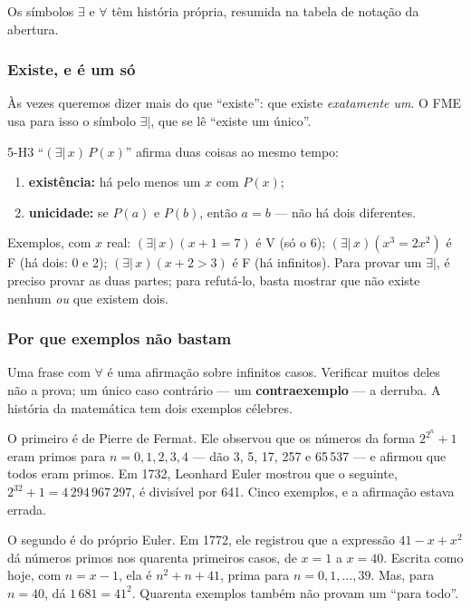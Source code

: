 Os símbolos $\exists$ e $\forall$ têm história própria, resumida na tabela de notação da abertura.

\subsubsection{Existe, e é um só}
Às vezes queremos dizer mais do que \enquote{existe}: que existe \emph{exatamente um}. O FME usa para isso o símbolo $\exists|$, que se lê \enquote{existe um único}.

\begin{construcao}{5-H3}
\enquote{$(\exists|\,x)\,P(x)$} afirma duas coisas ao mesmo tempo:
\begin{enumerate}[label=(\arabic*)]
  \item \textbf{existência:} há pelo menos um $x$ com $P(x)$;
  \item \textbf{unicidade:} se $P(a)$ e $P(b)$, então $a=b$ — não há dois diferentes.
\end{enumerate}
Exemplos, com $x$ real: $(\exists|\,x)(x+1=7)$ é V (só o 6); $(\exists|\,x)(x^3=2x^2)$ é F (há dois: 0 e 2); $(\exists|\,x)(x+2>3)$ é F (há infinitos). Para provar um $\exists|$, é preciso provar as duas partes; para refutá-lo, basta mostrar que não existe nenhum \emph{ou} que existem dois.
\end{construcao}

\subsubsection{Por que exemplos não bastam}
Uma frase com $\forall$ é uma afirmação sobre infinitos casos. Verificar muitos deles não a prova; um único caso contrário — um \textbf{contraexemplo} — a derruba. A história da matemática tem dois exemplos célebres.

O primeiro é de Pierre de Fermat. Ele observou que os números da forma $2^{2^n}+1$ eram primos para $n=0,1,2,3,4$ — dão 3, 5, 17, 257 e 65\,537 — e afirmou que todos eram primos. Em 1732, Leonhard Euler mostrou que o seguinte, $2^{32}+1=4\,294\,967\,297$, é divisível por 641. Cinco exemplos, e a afirmação estava errada.

O segundo é do próprio Euler. Em 1772, ele registrou que a expressão $41-x+x^2$ dá números primos nos quarenta primeiros casos, de $x=1$ a $x=40$. Escrita como hoje, com $n=x-1$, ela é $n^2+n+41$, prima para $n=0,1,\ldots,39$. Mas, para $n=40$, dá $1\,681=41^2$. Quarenta exemplos também não provam um \enquote{para todo}.

